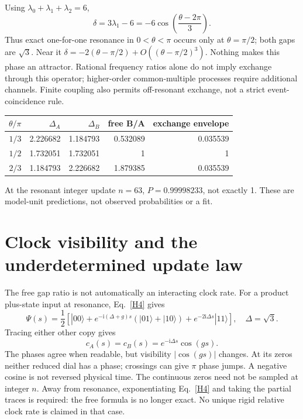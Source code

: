\documentclass[11pt,a4paper]{article}
\newcommand{\ii}{\mathrm i}
\newcommand{\ket}[1]{|#1\rangle}
\begin{document}
Using $\lambda_0+\lambda_1+\lambda_2=6$,
\begin{equation}
 \delta=3\lambda_1-6=-6\cos\left(\frac{\theta-2\pi}{3}\right).
\end{equation}
Thus exact one-for-one resonance in $0<\theta<\pi$ occurs only at
$\theta=\pi/2$; both gaps are $\sqrt3$. Near it
$\delta=-2(\theta-\pi/2)+O((\theta-\pi/2)^3)$.
Nothing makes this phase an attractor. Rational frequency ratios alone
do not imply exchange through this operator; higher-order common-multiple
processes require additional channels. Finite coupling also permits
off-resonant exchange, not a strict event-coincidence rule.

\begin{center}
\begin{tabular}{rrrrr}\toprule
$\theta/\pi$&$\Delta_A$&$\Delta_B$&free B/A&exchange envelope\\\midrule
$1/3$&2.226682&1.184793&0.532089&0.035539\\
$1/2$&1.732051&1.732051&1&1\\
$2/3$&1.184793&2.226682&1.879385&0.035539\\\bottomrule
\end{tabular}
\end{center}
At the resonant integer update $n=63$, $P=0.99998233$, not exactly 1.
These are model-unit predictions, not observed probabilities or a fit.

\newpage
\section{Clock visibility and the underdetermined update law}
The free gap ratio is not automatically an interacting clock rate.
For a product plus-state input at resonance, Eq.~\eqref{H4} gives
\begin{equation}
 \Psi(s)=\frac12\left[\ket{00}
 +e^{-\ii(\Delta+g)s}(\ket{01}+\ket{10})
 +e^{-2\ii\Delta s}\ket{11}\right],\quad \Delta=\sqrt3.
\end{equation}
Tracing either other copy gives
\begin{equation}
 c_A(s)=c_B(s)=e^{-\ii\Delta s}\cos(gs).\label{dials}
\end{equation}
The phases agree when readable, but visibility $|\cos(gs)|$ changes.
At its zeros neither reduced dial has a phase; crossings can give
$\pi$ phase jumps. A negative cosine is not reversed physical time.
The continuous zeros need not be sampled at integer $n$. Away from
resonance, exponentiating Eq.~\eqref{H4} and taking the partial traces
is required: the free formula is no longer exact. No unique rigid
relative clock rate is claimed in that case.
\end{document}
